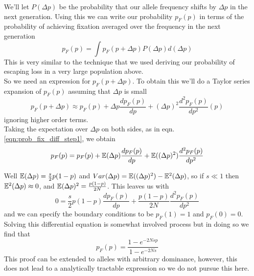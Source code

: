 We'll let $P(\Delta p)$ be the probability that our allele frequency
shifts by $\Delta p$ in the next generation. Using this we can write our probability $p_F(p)$ in terms of the probability of
achieving fixation averaged over the frequency in the next generation
\begin{equation}
p_F(p)  = \int p_F(p+\Delta p) P(\Delta p) d(\Delta p) \label{eqn:prob_fix_diff_step1}
\end{equation}
This is very similar to the technique that we used deriving our
probability of escaping loss in a very large population above. \\

So we need an expression for $p_F(p+\Delta p)$. To obtain this we'll
do a Taylor series expansion of $p_F(p)$ assuming that $\Delta p $ is small
\begin{equation}
p_F(p+\Delta p) \approx p_F(p) + \Delta p \frac{dp_F(p)}{dp} + (\Delta p)^2
\frac{d^2p_F(p)}{dp^2} (p)
\end{equation}
ignoring higher order terms.\\

Taking the expectation over $\Delta p $ on both sides, as in
eqn. \ref{eqn:prob_fix_diff_step1}, we obtain
\begin{equation}
p_F(p) = p_F(p) + \mathbb{E}(\Delta p) \frac{dp_F (p)}{dp} + \mathbb{E}((\Delta p)^2)
\frac{d^2p_F(p)}{dp^2}
\end{equation}

Well $\mathbb{E}(\Delta p) = \frac{s}{2}p(1-p)$ and $Var(\Delta p)= \mathbb{E}((\Delta
p)^2)-\mathbb{E}^2(\Delta p)$, so if $s \ll 1$ then $\mathbb{E}^2(\Delta p) \approx
0$, and $\mathbb{E}(\Delta p)^2 = \frac{p(1-p)}{2N}$. This leaves us with
\begin{equation}
0= \frac{s}{2}p(1-p)\frac{dp_F (p) }{dp} + \frac{p(1-p)}{2N}
\frac{d^2p_F (p) }{dp^2}
\end{equation}
and we can specify the boundary conditions to be $p_F(1)=1$ and $p_F(0)=0$. 
Solving this differential equation is somewhat involved process but in
doing so we find that
\begin{equation}
p_F(p) = \frac{1-e^{-2Ns p }}{1-e^{-2Ns}}
\end{equation}
This proof can be extended
to alleles with arbitrary dominance, however, this does not lead to a
analytically tractable expression so we do not pursue this here. 

